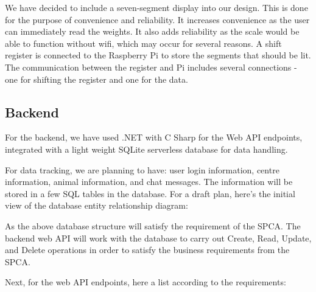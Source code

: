 We have decided to include a seven-segment display into our design. This is done for the purpose of convenience and reliability. It increases convenience as the user can immediately read the weights. It also adds reliability as the scale would be able to function without wifi, which may occur for several reasons. A shift register is connected to the Raspberry Pi to store the segments that should be lit. The communication between the register and Pi includes several connections - one for shifting the register and one for the data. 

\subsection{Backend}
For the backend, we have used .NET with C Sharp for the Web API endpoints, integrated with a light weight SQLite serverless database for data handling. 

For data tracking, we are planning to have: user login information, centre information, animal information, and chat messages. The information will be stored in a few SQL tables in the database. For a draft plan, here's the initial view of the database entity relationship diagram:

As the above database structure will satisfy the requirement of the SPCA. The backend web API will work with the database to carry out Create, Read, Update, and Delete operations in order to satisfy the business requirements from the SPCA.

Next, for the web API endpoints, here a list according to the requirements:

